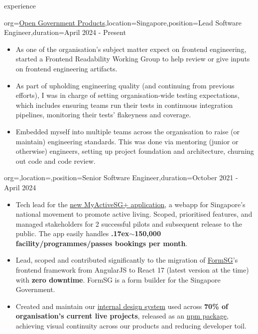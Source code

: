 \documentclass{resume}
\newcommand{\mytilde}{\raise.17ex\hbox{$\scriptstyle\mathtt{\sim}$}}
\begin{document}
\makeheader

\begin{ResumeSection}{experience}
    \begin{ResumeSubsection}{org=\href{https://open.gov.sg}{Open Government Products},location={Singapore},position={Lead Software Engineer},duration=April 2024 - Present}
        \begin{itemize} 
            \item As one of the organisation's subject matter expect on frontend engineering, started a Frontend Readability Working Group to help review or give inputs on frontend engineering artifacts. 
            \item As part of upholding engineering quality (and continuing from previous efforts), I was in charge of setting organisation-wide testing expectations, which includes ensuring teams run their tests in continuous integration pipelines, monitoring their tests' flakeyness and coverage.
            \item Embedded myself into multiple teams across the organisation to raise (or maintain) engineering standards. This was done via mentoring (junior or otherwise) engineers, setting up project foundation and architecture, churning out code and code review.
        \end{itemize}
        \medskip
    \end{ResumeSubsection}
    \begin{ResumeSubsection}{org=,location=,position={Senior Software Engineer},duration=October 2021 - April 2024}
        \begin{itemize}
            \item Tech lead for the \href{https://activesg.gov.sg/}{new MyActiveSG+ application}, a webapp for Singapore's national movement to promote active living. Scoped, prioritised features, and managed stakeholders for 2 successful pilots and subsequent release to the public. The app easily handles \textbf{\mytilde150,000 facility/programmes/passes bookings per month}.
            \item Lead, scoped and contributed significantly to the migration of \href{https://github.com/opengovsg/FormSG}{FormSG}'s frontend framework from AngularJS to React 17 (latest version at the time) with \textbf{zero downtime}. FormSG is a form builder for the Singapore Government.
            \item Created and maintain our \href{https://design.open.gov.sg/}{internal design system} used across \textbf{70\% of organisation's current live projects}, released as an \href{https://www.npmjs.com/package/@opengovsg/design-system-react}{npm package}, achieving visual continuity across our products and reducing developer toil.

\end{itemize}
\end{ResumeSubsection}
\end{ResumeSection}
\end{document}
